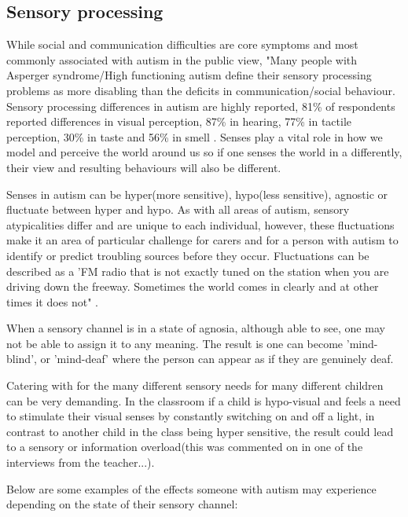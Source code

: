 \documentclass[11pt]{report}
\begin{document}
\subsection{Sensory processing}

While social and communication difficulties are core symptoms and most commonly associated with autism in the public view, "Many people with Asperger syndrome/High functioning autism define their sensory processing problems as more disabling than the deficits in communication/social behaviour\cite{olgab}. Sensory processing differences in autism are highly reported, 81\% of respondents reported differences in visual perception, 87\% in hearing, 77\% in tactile perception, 30\% in taste and 56\% in smell \cite{sensory_leisure}. Senses play a vital role in how we model and perceive the world around us so if one senses the world in a differently, their view and resulting behaviours will also be different. 

Senses in autism can be hyper(more sensitive), hypo(less sensitive), agnostic or fluctuate between hyper and hypo\cite{bayes}. As with all areas of autism, sensory atypicalities differ and are unique to each individual, however, these fluctuations make it an area of particular challenge for carers and for a person with autism to identify or predict troubling sources before they occur. Fluctuations can be described as a 'FM radio that is not exactly tuned on the station when you are driving down the freeway. Sometimes the world comes in clearly and at other times it does not" \cite{olgab}.

When a sensory channel is in a state of agnosia, although able to see, one may not be able to assign it to any meaning. The result is one can become 'mind-blind', or 'mind-deaf' where the person can appear as if they are genuinely deaf.

Catering with for the many different sensory needs for many different children can be very demanding. In the classroom if a child is hypo-visual and feels a need to stimulate their visual senses by constantly switching on and off a light, in contrast to another child in the class being hyper sensitive, the result could lead to a sensory or information overload(this was commented on in one of the interviews from the teacher...).

Below are some examples of the effects someone with autism may experience depending on the state of their sensory channel:
\end{document}
